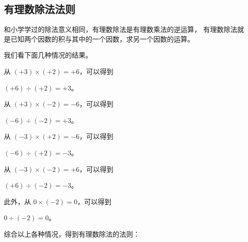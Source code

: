 \subsection{有理数除法法则}\label{subsec:1-12}

和小学学过的除法意义相同，有理数除法是有理数乘法的逆运算，
有理数除法就是已知两个因数的积与其中的一个因数，求另一个因数的运算。

我们看下面几种情况的结果。

从 \quad $(+3) \times (+2) = +6$，可以得到

\hspace*{2em} $(+6) \div (+2) = +3$。

从 \quad $(+3) \times (-2) = -6$，可以得到

\hspace*{2em} $(-6) \div (-2) = +3$。

从 \quad $(-3) \times (+2) = -6$，可以得到

\hspace*{2em} $(-6) \div (+2) = -3$。

从 \quad $(-3) \times (-2) = +6$，可以得到

\hspace*{2em} $(+6) \div (-2) = -3$。

此外，从 $0 \times (-2) = 0$，可以得到

\hspace*{4em} $0 \div (-2) = 0$。

综合以上各种情况，得到有理数除法的法则：\jiange

\jiange



